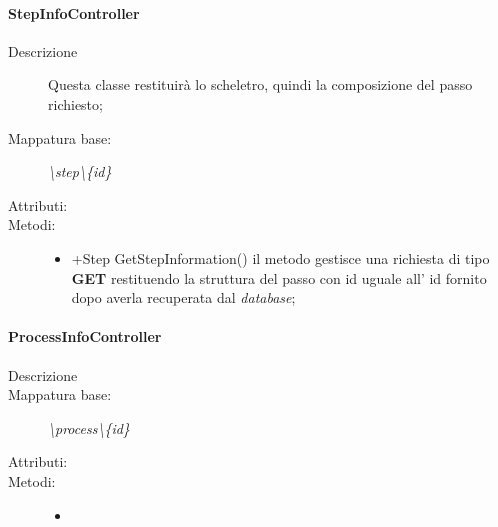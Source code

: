 \paragraph{StepInfoController}%
\begin{description}
	\item[Descrizione] Questa classe restituirà lo scheletro, quindi la composizione del passo richiesto;
	\item[Mappatura base:] \textit{\textbackslash step\textbackslash \{id\}}
	\item[Attributi:]
	\item[Metodi:]\begin{itemize}
					\item +Step GetStepInformation() il metodo gestisce una richiesta di tipo \textbf{GET} restituendo la struttura del passo con id uguale all' id fornito dopo averla recuperata dal \textit{database};
				\end{itemize}
\end{description}
\paragraph{ProcessInfoController}%
\begin{description}
	\item[Descrizione] 
	\item[Mappatura base:] \textit{\textbackslash process\textbackslash \{id\}}
	\item[Attributi:]
	\item[Metodi:]\begin{itemize}
					\item 
				\end{itemize}
\end{description}